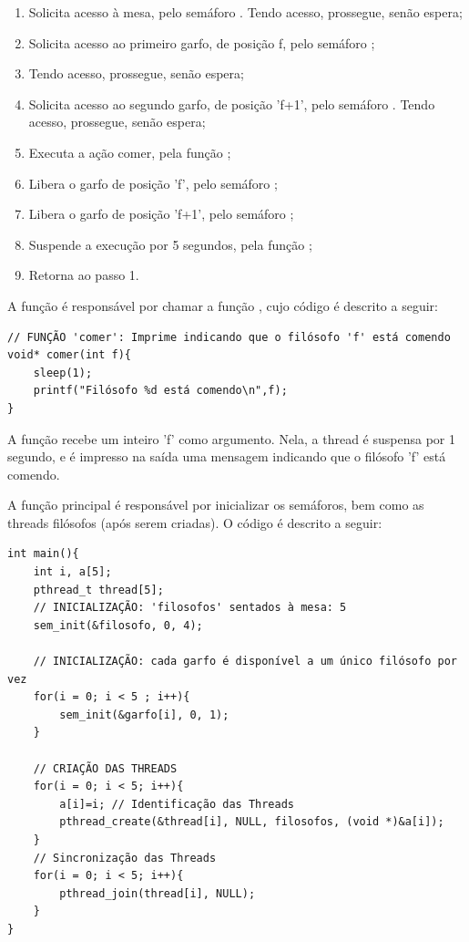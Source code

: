 \documentclass[
	12pt,				%
	openright,			%
	oneside,			%
	a4paper,			%
	chapter=TITLE,		%
	english,			%
	french,				%
	spanish,			%
	brazil				%
	]{abntex2}
\theoremstyle{definition}
\begin{document}
\begin{enumerate}
    \item Solicita acesso à mesa, pelo semáforo . Tendo acesso, prossegue, senão espera;
    \item Solicita acesso ao primeiro garfo, de posição f, pelo semáforo ;
    \item Tendo acesso, prossegue, senão espera;
    \item Solicita acesso ao segundo garfo, de posição 'f+1', pelo semáforo . Tendo acesso, prossegue, senão espera;
    \item Executa a ação comer, pela função ;
    \item Libera o garfo de posição 'f', pelo semáforo ;
    \item Libera o garfo de posição 'f+1', pelo semáforo ;
    \item Suspende a execução por 5 segundos, pela função ;
    \item Retorna ao passo 1.
\end{enumerate}
A função  é responsável por chamar a função , cujo código é descrito a seguir:

\begin{verbatim}
// FUNÇÃO 'comer': Imprime indicando que o filósofo 'f' está comendo
void* comer(int f){
    sleep(1);
    printf("Filósofo %d está comendo\n",f);
}
\end{verbatim}

A função  recebe um inteiro 'f' como argumento. Nela, a thread é suspensa por 1 segundo, e é impresso na saída uma mensagem indicando que o filósofo 'f' está comendo.

A função principal  é responsável por inicializar os semáforos, bem como as threads filósofos (após serem criadas). O código é descrito a seguir:

\begin{verbatim}
int main(){
    int i, a[5];
    pthread_t thread[5];
    // INICIALIZAÇÃO: 'filosofos' sentados à mesa: 5
    sem_init(&filosofo, 0, 4);

    // INICIALIZAÇÃO: cada garfo é disponível a um único filósofo por vez
    for(i = 0; i < 5 ; i++){
        sem_init(&garfo[i], 0, 1); 
    }

    // CRIAÇÃO DAS THREADS
    for(i = 0; i < 5; i++){
        a[i]=i; // Identificação das Threads
        pthread_create(&thread[i], NULL, filosofos, (void *)&a[i]);
    }
    // Sincronização das Threads
    for(i = 0; i < 5; i++){
        pthread_join(thread[i], NULL);
    }
}
\end{verbatim}
\end{document}
